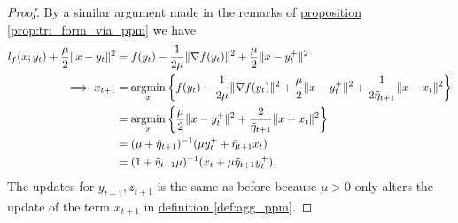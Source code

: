         \begin{proof}
            By a similar argument made in the remarks of \hyperref[prop:tri_form_via_ppm]{proposition \ref*{prop:tri_form_via_ppm}} we have 
            \begin{align*}
                l_f(x; y_t) + \frac{\mu}{2}\Vert x - y_t\Vert^2
                &= 
                f(y_t) - \frac{1}{2\mu}\Vert \nabla f(y_t)\Vert^2 + \frac{\mu}{2}\Vert x - y_t^+\Vert^2
                \\
                \implies 
                x_{t + 1} &= 
                \mathop{\rm argmin}\limits_{x} 
                \left\lbrace
                    f(y_t) - \frac{1}{2\mu}\Vert \nabla f(y_t)\Vert^2 + \frac{\mu}{2}\Vert x - y_t^+\Vert^2
                    + 
                    \frac{1}{2\tilde \eta_{t + 1}} \Vert x - x_t\Vert^2
                \right\rbrace
                \\
                &= 
                \mathop{\rm argmin}\limits_{x}
                \left\lbrace
                    \frac{\mu}{2}\Vert x - y_t^+\Vert^2 + 
                    \frac{2}{\tilde \eta_{t + 1}} \Vert x - x_t\Vert^2
                \right\rbrace
                \\
                &= (\mu + \tilde \eta_{t + 1})^{-1}
                (\mu y_t^+ + \tilde \eta_{t + 1}x_t)
                \\
                &= (1 + \tilde \eta_{t + 1}\mu)^{-1}
                (x_t + \mu\tilde \eta_{t + 1}y_t^+). 
            \end{align*}
            The updates for $y_{t + 1}, z_{t + 1}$ is the same as before because $\mu > 0$ only alters the update of the term $x_{t + 1}$ in \hyperref[def:agg_ppm]{definition \ref*{def:agg_ppm}}. 
        \end{proof}
        
